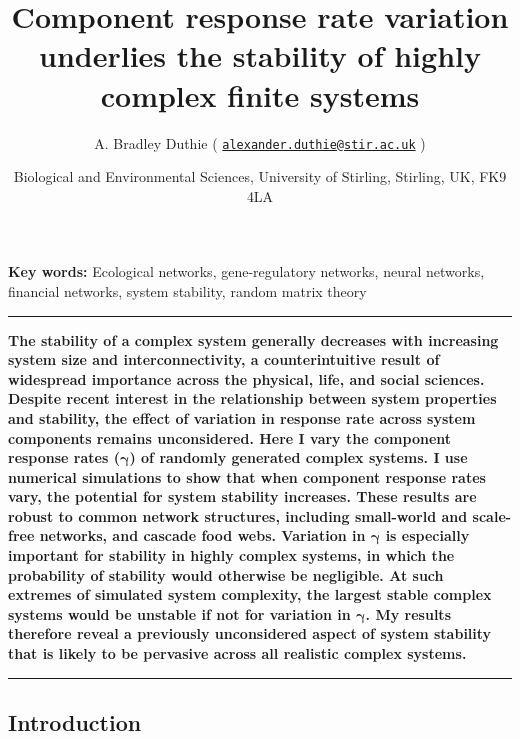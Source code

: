 \documentclass[]{article}
\title{Component response rate variation underlies the stability of highly
complex finite systems}
\author{A. Bradley Duthie (
\href{mailto:alexander.duthie@stir.ac.uk}{\nolinkurl{alexander.duthie@stir.ac.uk}}
)}
\date{Biological and Environmental Sciences, University of Stirling, Stirling,
UK, FK9 4LA}
\begin{document}
\maketitle

\textbf{Key words:} Ecological networks, gene-regulatory networks,
neural networks, financial networks, system stability, random matrix
theory


\vspace{10mm}
\hrule
\vspace{2mm}

\textbf{The stability of a complex system generally decreases with increasing
system size and interconnectivity, a counterintuitive result of
widespread importance across the physical, life, and social sciences.
Despite recent interest in the relationship between system properties
and stability, the effect of variation in response rate across system
components remains unconsidered. Here I vary the component response
rates (\(\boldsymbol{\gamma}\)) of randomly generated complex systems. I
use numerical simulations to show that when component response rates
vary, the potential for system stability increases. These results are
robust to common network structures, including small-world and
scale-free networks, and cascade food webs. Variation in
\(\boldsymbol{\gamma}\) is especially important for stability in highly
complex systems, in which the probability of stability would otherwise
be negligible. At such extremes of simulated system complexity, the
largest stable complex systems would be unstable if not for variation in
\(\boldsymbol{\gamma}\). My results therefore reveal a previously
unconsidered aspect of system stability that is likely to be pervasive
across all realistic complex systems.}

\vspace{2mm}
\hrule
\vspace{2mm}

\subsection{Introduction}\label{introduction}
\end{document}

